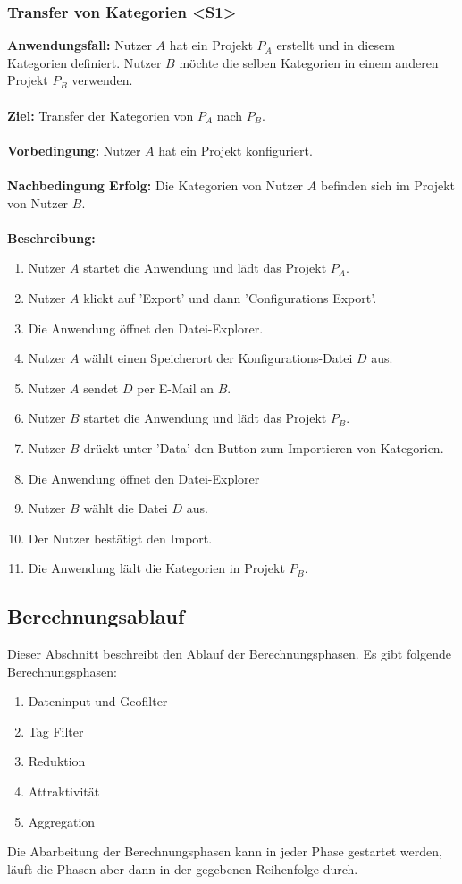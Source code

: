 \documentclass[parskip=full]{scrartcl} %
\begin{document}
\subsubsection*{Transfer von Kategorien <S1>}
\textbf{Anwendungsfall:} Nutzer $A$ hat ein Projekt $P_A$ erstellt und in diesem Kategorien definiert. Nutzer $B$ möchte die selben Kategorien in einem anderen Projekt $P_B$ verwenden.\\\\
\textbf{Ziel:} Transfer der Kategorien von $P_A$ nach $P_B$.\\\\
\textbf{Vorbedingung:} Nutzer $A$ hat ein Projekt konfiguriert.\\\\
\textbf{Nachbedingung Erfolg:} Die Kategorien von Nutzer $A$ befinden sich im Projekt von Nutzer $B$.\\\\
\textbf{Beschreibung:}
\begin{enumerate}
    \item Nutzer $A$ startet die Anwendung und lädt das Projekt $P_A$.
    \item Nutzer $A$ klickt auf 'Export' und dann 'Configurations Export'.
    \item Die Anwendung öffnet den Datei-Explorer.
    \item Nutzer $A$ wählt einen Speicherort der Konfigurations-Datei $D$ aus.
    \item Nutzer $A$ sendet $D$ per E-Mail an $B$.
    \item Nutzer $B$ startet die Anwendung und lädt das Projekt $P_B$.
    \item Nutzer $B$ drückt unter 'Data' den Button zum Importieren von Kategorien.
    \item Die Anwendung öffnet den Datei-Explorer
    \item Nutzer $B$ wählt die Datei $D$ aus.
    \item Der Nutzer bestätigt den Import.
    \item Die Anwendung lädt die Kategorien in Projekt $P_B$.
\end{enumerate}
\newpage






\subsection{Berechnungsablauf} \hypertarget{calculations}{}
Dieser Abschnitt beschreibt den Ablauf der Berechnungsphasen. Es gibt folgende Berechnungsphasen:
\begin{enumerate}
    \item Dateninput und Geofilter
    \item Tag Filter
    \item Reduktion
    \item Attraktivität
    \item Aggregation
\end{enumerate}
Die Abarbeitung der Berechnungsphasen kann in jeder Phase gestartet werden, läuft die Phasen aber dann in der gegebenen Reihenfolge durch.
\end{document}

